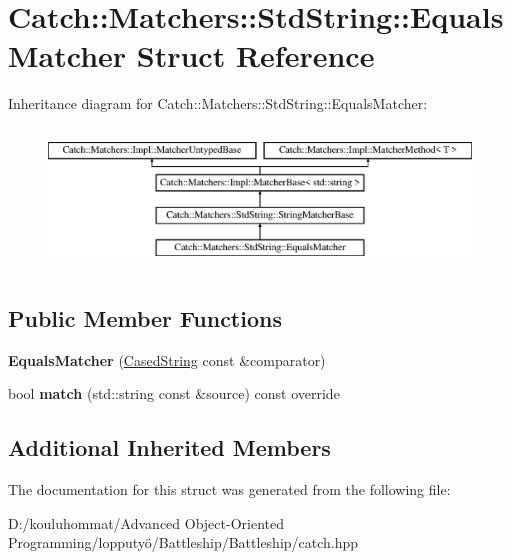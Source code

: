 \hypertarget{struct_catch_1_1_matchers_1_1_std_string_1_1_equals_matcher}{}\section{Catch\+:\+:Matchers\+:\+:Std\+String\+:\+:Equals\+Matcher Struct Reference}
\label{struct_catch_1_1_matchers_1_1_std_string_1_1_equals_matcher}
Inheritance diagram for Catch\+:\+:Matchers\+:\+:Std\+String\+:\+:Equals\+Matcher\+:\begin{figure}[H]
\begin{center}
\leavevmode
\includegraphics[height=3.758389cm]{struct_catch_1_1_matchers_1_1_std_string_1_1_equals_matcher}
\end{center}
\end{figure}
\subsection*{Public Member Functions}
\begin{DoxyCompactItemize}
\item 
\mbox{\label{struct_catch_1_1_matchers_1_1_std_string_1_1_equals_matcher_ab740f1fb2310e9fe3fed5134d4c7e4c8}} 
{\bfseries Equals\+Matcher} (\mbox{\hyperlink{struct_catch_1_1_matchers_1_1_std_string_1_1_cased_string}{Cased\+String}} const \&comparator)
\item 
\mbox{\label{struct_catch_1_1_matchers_1_1_std_string_1_1_equals_matcher_a0bb9d64693f7bb1ef7441062d219f21a}} 
bool {\bfseries match} (std\+::string const \&source) const override
\end{DoxyCompactItemize}
\subsection*{Additional Inherited Members}


The documentation for this struct was generated from the following file\+:\begin{DoxyCompactItemize}
\item 
D\+:/kouluhommat/\+Advanced Object-\/\+Oriented Programming/lopputyö/\+Battleship/\+Battleship/catch.\+hpp\end{DoxyCompactItemize}
